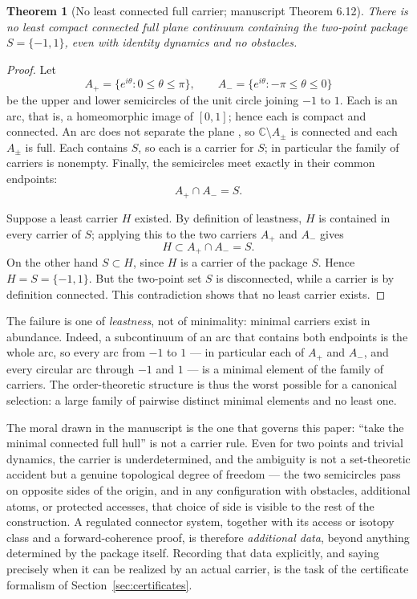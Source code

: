 \documentclass[11pt,reqno]{amsart}
\newtheorem{theorem}{Theorem}[section]
\theoremstyle{definition}
\theoremstyle{remark}
\newcommand{\C}{\mathbb C}
\begin{document}
\begin{theorem}[No least connected full carrier; manuscript Theorem 6.12]\label{thm:no-least}
There is no least compact connected full plane continuum containing the
two-point package $S=\{-1,1\}$, even with identity dynamics and no obstacles.
\end{theorem}

\begin{proof}
Let
\[
A_+=\{e^{i\theta}:0\le\theta\le\pi\},
\qquad
A_-=\{e^{i\theta}:-\pi\le\theta\le 0\}
\]
be the upper and lower semicircles of the unit circle joining $-1$ to $1$.
Each is an arc, that is, a homeomorphic image of $[0,1]$; hence each is
compact and connected. An arc does not separate the plane
\cite{New51}, so $\C\setminus A_\pm$ is connected and each $A_\pm$ is full.
Each contains $S$, so each is a carrier for $S$; in particular the family of
carriers is nonempty. Finally, the semicircles meet exactly in their common
endpoints:
\[
A_+\cap A_-=S .
\]

Suppose a least carrier $H$ existed. By definition of leastness, $H$ is
contained in every carrier of $S$; applying this to the two carriers $A_+$
and $A_-$ gives
\[
H\subset A_+\cap A_-=S .
\]
On the other hand $S\subset H$, since $H$ is a carrier of the package $S$.
Hence $H=S=\{-1,1\}$. But the two-point set $S$ is disconnected, while a
carrier is by definition connected. This contradiction shows that no least
carrier exists.
\end{proof}

The failure is one of \emph{leastness}, not of minimality: minimal carriers
exist in abundance. Indeed, a subcontinuum of an arc that contains both
endpoints is the whole arc, so every arc from $-1$ to $1$ --- in particular
each of $A_+$ and $A_-$, and every circular arc through $-1$ and $1$ --- is a
minimal element of the family of carriers. The order-theoretic structure is
thus the worst possible for a canonical selection: a large family of pairwise
distinct minimal elements and no least one.

The moral drawn in the manuscript is the one that governs this paper: ``take
the minimal connected full hull'' is not a carrier rule. Even for two points
and trivial dynamics, the carrier is underdetermined, and the ambiguity is not
a set-theoretic accident but a genuine topological degree of freedom --- the
two semicircles pass on opposite sides of the origin, and in any configuration
with obstacles, additional atoms, or protected accesses, that choice of side
is visible to the rest of the construction. A regulated connector system,
together with its access or isotopy class and a forward-coherence proof, is
therefore \emph{additional data}, beyond anything determined by the package
itself. Recording that data explicitly, and saying precisely when it can be
realized by an actual carrier, is the task of the certificate formalism of
Section~\ref{sec:certificates}.
\end{document}
